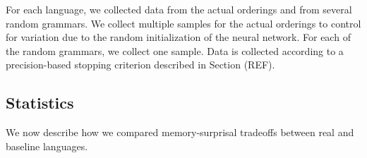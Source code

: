 \documentclass[11pt,letterpaper]{article}
\begin{document}

For each language, we collected data from the actual orderings and from several random grammars.
We collect multiple samples for the actual orderings to control for variation due to the random initialization of the neural network.
For each of the random grammars, we collect one sample.
Data is collected according to a precision-based stopping criterion described in Section (REF).




%



%
%


\subsection{Statistics}

We now describe how we compared memory-surprisal tradeoffs between real and baseline languages.

\end{document}
